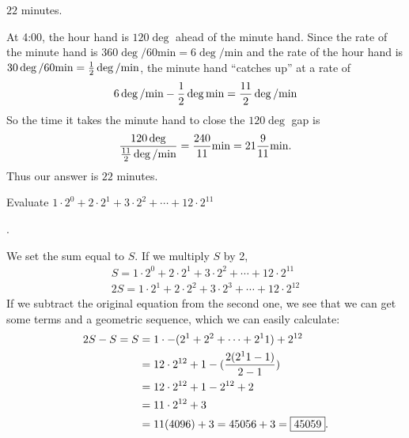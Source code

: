 \documentclass[11pt]{article}
\DeclareRobustCommand{\frac}[3][0pt]{%
  {\begingroup\hspace{#1}#2\hspace{#1}\endgroup\over\hspace{#1}#3\hspace{#1}}}
\begin{document}
\begin{answer}
$\boxed{22}$ minutes.
\end{answer}
\begin{solution}
At 4:00, the hour hand is $120 \deg$ ahead of the minute hand. Since the rate of the minute hand is $360 \deg / 60 \text{min} = 6 \deg / \text{min}$ and the rate of the hour hand is $30 \deg / 60 \text{min}= \frac{1}{2} \deg / \text{min}$, the minute hand ``catches up'' at a rate of
$$6 \deg / \text{min}-\frac{1}{2} \deg \text{min} = \frac{11}{2} \deg / \text{min}$$
So the time it takes the minute hand to close the $120 \deg$ gap is
$$\frac{120 \deg}{\frac{11}{2} \deg / \text{min}} = \frac{240}{11} \text{min} = 21 \frac{9}{11} \text{min}.$$
Thus our answer is $\boxed{22}$ minutes.
\end{solution}

\begin{problem}Evaluate $1\cdot2^{0} + 2\cdot2^1 + 3\cdot2^2 +\cdots+12\cdot2^{11}$
\end{problem}

\begin{answer}
.
\end{answer}
\begin{solution}
We set the sum equal to $S$. If we multiply $S$ by 2,
\begin{align*}
S = 1\cdot2^{0} + 2\cdot2^1 + 3\cdot2^2 +\cdots+12\cdot2^{11} \\
2S = 1\cdot2^{1} + 2\cdot2^2 + 3\cdot2^3 +\cdots+12\cdot2^{12}
\end{align*}
If we subtract the original equation from the second one, we see that we can get some terms and a geometric sequence, which we can easily calculate:
\begin{align*}
2S-S=S &=1 \cdot - (2^1+2^2+\cdots+2^11)+2^{12} \\
&= 12\cdot 2^{12}+1 - (\frac{2(2^11-1)}{2-1}) \\
&= 12\cdot 2^{12}+1-2^{12}+2 \\
&= 11 \cdot 2^{12} +3 \\
&= 11(4096) +3 = 45056+3 = \boxed{45059}.
\end{align*}
\end{solution}
\end{document}
